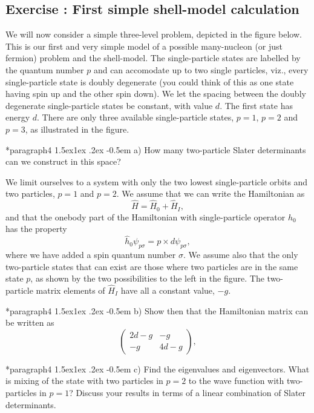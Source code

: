 \documentclass[%
oneside,                 %
final,                   %
10pt]{article}
\makeatletter
\newenvironment{doconceexercise}{}{}
\newcounter{doconceexercisecounter}
\newcommand\subex{\@startsection*{paragraph}{4}{\z@}%
                  {1.5ex\@plus1ex \@minus.2ex}%
                  {-0.5em}%
                  {\normalfont\normalsize\bfseries}}
\makeatother
\begin{document}
\begin{doconceexercise}

\subsection*{Exercise \thedoconceexercisecounter: First simple shell-model calculation}


We will now consider a simple three-level problem, depicted in the figure below. This is our first and very simple model of a possible many-nucleon (or just fermion) problem and the shell-model.
The single-particle states are labelled by the quantum number $p$ and can accomodate up to two single particles,  viz., every single-particle state  is doubly degenerate (you could think of this as one state having spin up and the other spin down). 
We let the spacing between the doubly degenerate single-particle states be constant, with value $d$.  The first state
has energy $d$. There are only three available single-particle states, $p=1$, $p=2$ and $p=3$, as illustrated
in the figure.


\subex{a)}
How many two-particle Slater determinants can we construct in this space? 

We limit ourselves to a system with only the two lowest single-particle orbits and two particles, $p=1$ and $p=2$. We assume that we can write the Hamiltonian as
\[
       \hat{H}=\hat{H}_0+\hat{H}_I,
\]
and that the onebody part of the Hamiltonian with single-particle operator $\hat{h}_0$ has the property
\[
\hat{h}_0\psi_{p\sigma} = p\times d \psi_{p\sigma},
\]
where we have added a spin quantum number $\sigma$. 
We assume also that the only two-particle states that can exist are those where two particles are in the 
same state $p$, as shown by the two possibilities to the left in the figure.
The two-particle matrix elements of $\hat{H}_I$ have all a constant value, $-g$.

\subex{b)}
Show then that the Hamiltonian matrix can be written as 
\[
\left(\begin{array}{cc}2d-g &-g \\
-g &4d-g \end{array}\right),
\]

\subex{c)}
Find the eigenvalues and eigenvectors.  What is mixing of the state with two particles in $p=2$  to the wave function with two-particles in $p=1$? Discuss your results in terms of a linear combination of Slater determinants.


\end{doconceexercise}
\end{document}
